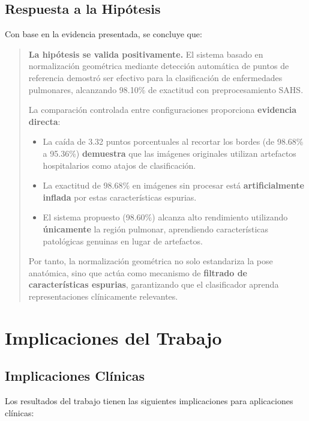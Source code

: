 \subsection{Respuesta a la Hipótesis}
\label{subsec:respuesta_hipotesis}

Con base en la evidencia presentada, se concluye que:

\begin{quote}
\textbf{La hipótesis se valida positivamente.} El sistema basado en normalización geométrica mediante detección automática de puntos de referencia demostró ser efectivo para la clasificación de enfermedades pulmonares, alcanzando 98.10\% de exactitud con preprocesamiento SAHS.

La comparación controlada entre configuraciones proporciona \textbf{evidencia directa}:
\begin{itemize}
    \item La caída de 3.32 puntos porcentuales al recortar los bordes (de 98.68\% a 95.36\%) \textbf{demuestra} que las imágenes originales utilizan artefactos hospitalarios como atajos de clasificación.
    \item La exactitud de 98.68\% en imágenes sin procesar está \textbf{artificialmente inflada} por estas características espurias.
    \item El sistema propuesto (98.60\%) alcanza alto rendimiento utilizando \textbf{únicamente} la región pulmonar, aprendiendo características patológicas genuinas en lugar de artefactos.
\end{itemize}

Por tanto, la normalización geométrica no solo estandariza la pose anatómica, sino que actúa como mecanismo de \textbf{filtrado de características espurias}, garantizando que el clasificador aprenda representaciones clínicamente relevantes.
\end{quote}

\section{Implicaciones del Trabajo}
\label{sec:implicaciones}

\subsection{Implicaciones Clínicas}
\label{subsec:implicaciones_clinicas}

Los resultados del trabajo tienen las siguientes implicaciones para aplicaciones clínicas:

